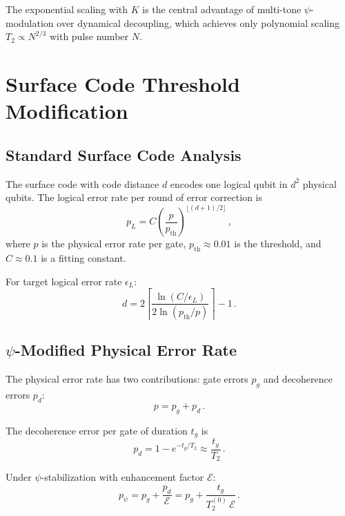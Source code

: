 \documentclass[aps,prl,twocolumn,superscriptaddress,nofootinbib,longbibliography]{revtex4-2}
\begin{document}
The exponential scaling with $K$ is the central advantage of multi-tone
$\psi$-modulation over dynamical decoupling, which achieves only
polynomial scaling $T_2 \propto N^{2/3}$ with pulse number $N$.

\section{Surface Code Threshold Modification}
\label{sec:surface}

\subsection{Standard Surface Code Analysis}

The surface code with code distance $d$ encodes one logical qubit in
$d^2$ physical qubits. The logical error rate per round of error
correction is~\cite{Fowler2012}
\begin{equation}\label{eq:pL-standard}
p_L = C\left(\frac{p}{p_{\text{th}}}\right)^{\lfloor(d+1)/2\rfloor}\,,
\end{equation}
where $p$ is the physical error rate per gate, $p_{\text{th}} \approx 0.01$
is the threshold, and $C \approx 0.1$ is a fitting constant.

For target logical error rate $\epsilon_L$:
\begin{equation}\label{eq:d-standard}
d = 2\left\lceil\frac{\ln(C/\epsilon_L)}{2\ln(p_{\text{th}}/p)}\right\rceil - 1\,.
\end{equation}

\subsection{$\psi$-Modified Physical Error Rate}

The physical error rate has two contributions: gate errors $p_g$ and
decoherence errors $p_d$:
\begin{equation}
p = p_g + p_d\,.
\end{equation}

The decoherence error per gate of duration $t_g$ is
\begin{equation}
p_d = 1 - e^{-t_g/T_2} \approx \frac{t_g}{T_2}\,.
\end{equation}

Under $\psi$-stabilization with enhancement factor $\mathcal{E}$:
\begin{equation}\label{eq:p-psi}
p_\psi = p_g + \frac{p_d}{\mathcal{E}} = p_g + \frac{t_g}{T_2^{(0)}\,\mathcal{E}}\,.
\end{equation}
\end{document}
